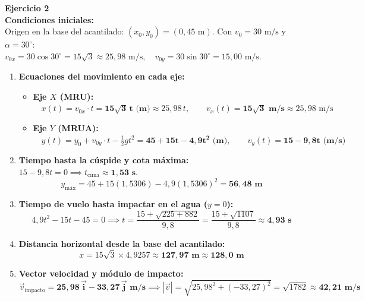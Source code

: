 \documentclass[11pt,a4paper]{article}
\begin{document}
\vspace{0.4cm}
\noindent\textbf{Ejercicio 2}\\
\textbf{Condiciones iniciales:}\\
Origen en la base del acantilado: $(x_0, y_0) = (0, 45\text{ m})$. Con $v_0 = 30\text{ m/s}$ y $\alpha = 30^\circ$:\\
$v_{0x} = 30 \cos 30^\circ = 15\sqrt{3} \approx 25{,}98\text{ m/s}, \quad v_{0y} = 30 \sin 30^\circ = 15{,}00\text{ m/s}$.

\begin{enumerate}[label=\textbf{\alph*)}, leftmargin=2em, itemsep=6pt]
    \item \textbf{Ecuaciones del movimiento en cada eje:}
    \begin{itemize}[leftmargin=1.5em, itemsep=3pt]
        \item \textbf{Eje $X$ (MRU):} $\quad x(t) = v_{0x} \cdot t = \mathbf{15\sqrt{3}\,t\text{ (m)}} \approx 25{,}98\,t, \qquad v_x(t) = \mathbf{15\sqrt{3}\text{ m/s}} \approx 25{,}98\text{ m/s}$
        \item \textbf{Eje $Y$ (MRUA):} $\quad y(t) = y_0 + v_{0y} \cdot t - \frac{1}{2}gt^2 = \mathbf{45 + 15t - 4{,}9t^2\text{ (m)}}, \qquad v_y(t) = \mathbf{15 - 9{,}8t\text{ (m/s)}}$
    \end{itemize}
    \item \textbf{Tiempo hasta la cúspide y cota máxima:}
    $15 - 9{,}8t = 0 \implies t_{\text{cima}} \approx \mathbf{1{,}53\text{ s}}$.
    \[
    y_{\text{máx}} = 45 + 15(1{,}5306) - 4{,}9(1{,}5306)^2 = \mathbf{56{,}48\text{ m}}
    \]
    \item \textbf{Tiempo de vuelo hasta impactar en el agua ($y = 0$):}
    \[
    4{,}9t^2 - 15t - 45 = 0 \implies t = \frac{15 + \sqrt{225 + 882}}{9{,}8} = \frac{15 + \sqrt{1107}}{9{,}8} \approx \mathbf{4{,}93\text{ s}}
    \]
    \item \textbf{Distancia horizontal desde la base del acantilado:}
    \[
    x = 15\sqrt{3} \times 4{,}9257 \approx \mathbf{127{,}97\text{ m}} \approx \mathbf{128{,}0\text{ m}}
    \]
    \item \textbf{Vector velocidad y módulo de impacto:}
    \[
    \vec{v}_{\text{impacto}} = \mathbf{25{,}98\,\vec{i} - 33{,}27\,\vec{j}\text{ m/s}} \implies |\vec{v}| = \sqrt{25{,}98^2 + (-33{,}27)^2} = \sqrt{1782} \approx \mathbf{42{,}21\text{ m/s}}
    \]
\end{enumerate}
\end{document}
